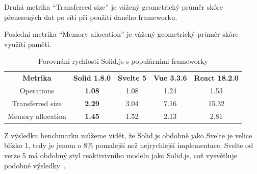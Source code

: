Druhá metrika ``Transferred size'' je vážený geometrický průměr skóre přenesených dat po síti při použití daného frameworku.

Poslední metrika ``Memory allocation'' je vážený geometrický průměr skóre využití paměti.


\begin{table}[ht]
      \begin{ctucolortab}
            \begin{tabular}{c c c c c}
                  \bfseries Metrika & \bfseries{Solid 1.8.0} & \bfseries{Svelte 5} & \bfseries{Vue 3.3.6} & \bfseries{React 18.2.0} \\\Midrule{}
                  Operations        & \textbf{1.08}          & 1.08                & 1.24                 & 1.53                    \\
                  Transferred size  & \textbf{2.29}          & 3.04                & 7.16                 & 15.32                   \\
                  Memory allocation & \textbf{1.45}          & 1.52                & 2.13                 & 2.81
            \end{tabular}
      \end{ctucolortab}
      \caption{Porovnání rychlosti Solid.js s populárními frameworky}
      \label{tab:technology1}
\end{table}

Z výsledku benchmarku můžeme vidět, že Solid.js obdobně jako Svelte je velice blízko 1, tedy je jenom o 8\% pomalejší než nejrychlejší implementace.
Svelte od verze 5 má obdobný styl reaktivivního modelu jako Solid.js, což vysvětluje podobné výsledky~\cite{svelte-reactivity}.




